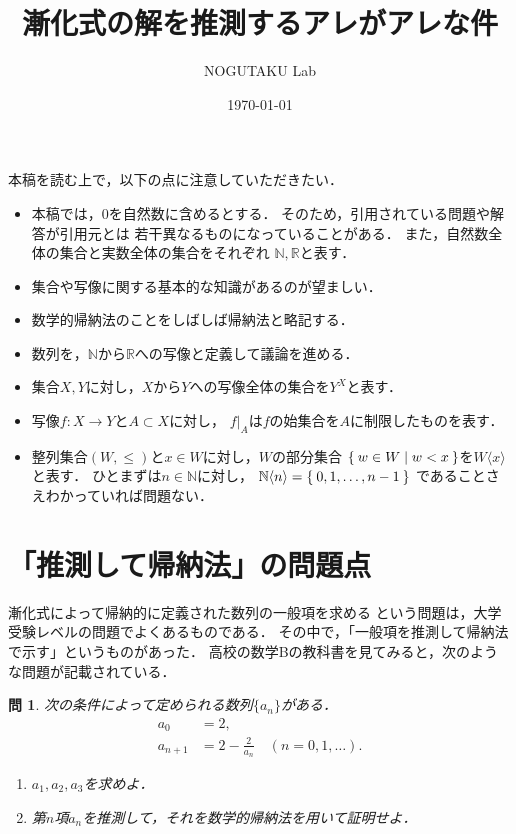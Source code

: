 \documentclass[11pt,a4paper]{ltjsarticle} %
\title{漸化式の解を推測するアレがアレな件}
\author{NOGUTAKU Lab}
\date{\today}
\theoremstyle{mystyle} %
\newtheorem{que}{問} %
\begin{document}
%
\maketitle

本稿を読む上で，以下の点に注意していただきたい．
\begin{itemize}
  \item 本稿では，0を自然数に含めるとする．
    そのため，引用されている問題や解答が引用元とは
    若干異なるものになっていることがある．
    また，自然数全体の集合と実数全体の集合をそれぞれ
    $\mathbb{N}, \mathbb{R}$と表す．
  \item 集合や写像に関する基本的な知識があるのが望ましい．
  \item 数学的帰納法のことをしばしば帰納法と略記する．
  \item 数列を，$\mathbb{N}$から$\mathbb{R}$への写像と定義して議論を進める．
  \item 集合$X,Y$に対し，$X$から$Y$への写像全体の集合を$Y^X$と表す．
  \item 写像$f \colon X \longrightarrow Y$と$A \subset X$に対し，
    $f|_A$は$f$の始集合を$A$に制限したものを表す．
  \item 整列集合$(W, \leq)$と$x \in W$に対し，$W$の部分集合
    $\Set{ w \in W \mid w < x}$を$W \langle x \rangle$と表す．
    ひとまずは$n \in \mathbb{N}$に対し，
    $\mathbb{N} \langle n \rangle = \Set{ 0, 1, \ldots, n-1}$
    であることさえわかっていれば問題ない．
\end{itemize}
%

\section{「推測して帰納法」の問題点}

漸化式によって帰納的に定義された数列の一般項を求める
という問題は，大学受験レベルの問題でよくあるものである．
その中で，「一般項を推測して帰納法で示す」というものがあった．
高校の数学Bの教科書\cite{kyoukasyo}を見てみると，次のような問題が記載されている．

\begin{que} \label{que:suisoku}
  次の条件によって定められる数列$\{ a_n \}$がある．
  \begin{align*}
    a_0 & = 2 , \\
    a_{n+1} & = 2- \frac{2}{a_n} \quad ( n = 0,1, \ldots).
  \end{align*}
  \begin{enumerate}
    \item $a_1,a_2,a_3$を求めよ．
    \item 第$n$項$a_n$を推測して，それを数学的帰納法を用いて証明せよ．
  \end{enumerate}
\end{que}
\end{document}
